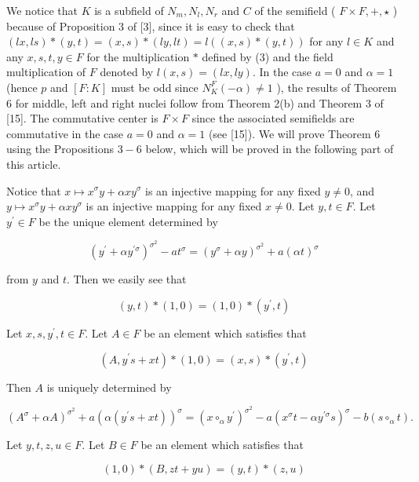 \documentclass[10pt]{article}
\begin{document}
We notice that $K$ is a subfield of $N_{m}, N_{l}, N_{r}$ and $C$ of the semifield ( $F \times F,+, \star$ ) because of Proposition 3 of [3], since it is easy to check that $(l x, l s) *(y, t)=(x, s) *(l y, l t)= l((x, s) *(y, t))$ for any $l \in K$ and any $x, s, t, y \in F$ for the multiplication $*$ defined by (3) and the field multiplication of $F$ denoted by $l(x, s)=(l x, l y)$. In the case $a=0$ and $\alpha=1$ (hence $p$ and $[F: K]$ must be odd since $N_{K}^{F}(-\alpha) \neq 1$ ), the results of Theorem 6 for middle, left and right nuclei follow from Theorem 2(b) and Theorem 3 of [15]. The commutative center is $F \times F$ since the associated semifields are commutative in the case $a=0$ and $\alpha=1$ (see [15]). We will prove Theorem 6 using the Propositions $3-6$ below, which will be proved in the following part of this article.

Notice that $x \mapsto x^{\sigma} y+\alpha x y^{\sigma}$ is an injective mapping for any fixed $y \neq 0$, and $y \mapsto x^{\sigma} y+\alpha x y^{\sigma}$ is an injective mapping for any fixed $x \neq 0$. Let $y, t \in F$. Let $y^{\prime} \in F$ be the unique element determined by


\begin{equation*}
\left(y^{\prime}+\alpha y^{\prime \sigma}\right)^{\sigma^{2}}-a t^{\sigma}=\left(y^{\sigma}+\alpha y\right)^{\sigma^{2}}+a(\alpha t)^{\sigma} \tag{4}
\end{equation*}


from $y$ and $t$. Then we easily see that

$$
(y, t) *(1,0)=(1,0) *\left(y^{\prime}, t\right)
$$

Let $x, s, y^{\prime}, t \in F$. Let $A \in F$ be an element which satisfies that

$$
\left(A, y^{\prime} s+x t\right) *(1,0)=(x, s) *\left(y^{\prime}, t\right)
$$

Then $A$ is uniquely determined by


\begin{equation*}
\left(A^{\sigma}+\alpha A\right)^{\sigma^{2}}+a\left(\alpha\left(y^{\prime} s+x t\right)\right)^{\sigma}=\left(x \circ_{\alpha} y^{\prime}\right)^{\sigma^{2}}-a\left(x^{\sigma} t-\alpha y^{\prime \sigma} s\right)^{\sigma}-b\left(s \circ_{\alpha} t\right) . \tag{5}
\end{equation*}


Let $y, t, z, u \in F$. Let $B \in F$ be an element which satisfies that

$$
(1,0) *(B, z t+y u)=(y, t) *(z, u)
$$
\end{document}
